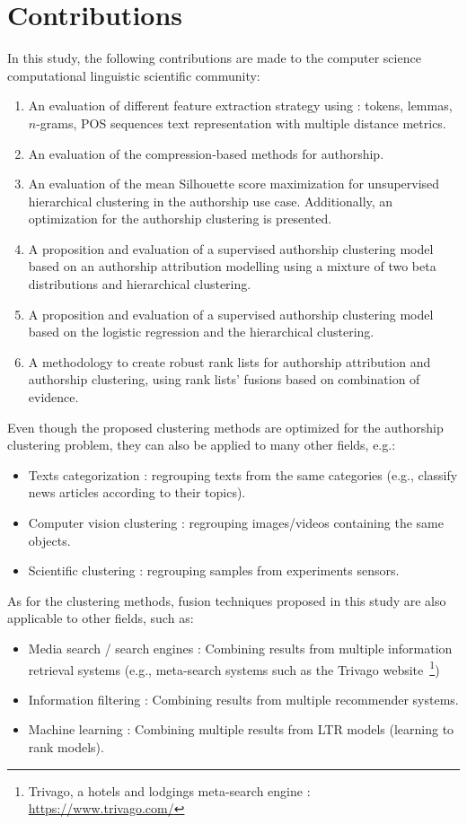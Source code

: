 \section{Contributions}

In this study, the following contributions are made to the computer science computational linguistic scientific community:

\begin{enumerate}
  \item
  An evaluation of different feature extraction strategy using : tokens, lemmas, $n$-grams, POS sequences text representation with multiple distance metrics.
  \item
  An evaluation of the compression-based methods for authorship.
  \item
  An evaluation of the mean Silhouette score maximization for unsupervised hierarchical clustering in the authorship use case. Additionally, an optimization for the authorship clustering is presented.
  \item
  A proposition and evaluation of a supervised authorship clustering model based on an authorship attribution modelling using a mixture of two beta distributions and hierarchical clustering.
  \item
  A proposition and evaluation of a supervised authorship clustering model based on the logistic regression and the hierarchical clustering.
  \item
  A methodology to create robust rank lists for authorship attribution and authorship clustering, using rank lists' fusions based on combination of evidence.
\end{enumerate}

Even though the proposed clustering methods are optimized for the authorship clustering problem, they can also be applied to many other fields, e.g.:
\begin{itemize}
  \item
  Texts categorization : regrouping texts from the same categories (e.g., classify news articles according to their topics).
  \item
  Computer vision clustering : regrouping images/videos containing the same objects.
  \item
  Scientific clustering : regrouping samples from experiments sensors.
\end{itemize}

As for the clustering methods, fusion techniques proposed in this study are also applicable to other fields, such as:
\begin{itemize}
  \item
  Media search / search engines : Combining results from multiple information retrieval systems (e.g., meta-search systems such as the Trivago website~\footnote{Trivago, a hotels and lodgings meta-search engine : \url{https://www.trivago.com/}})
  \item
  Information filtering : Combining results from multiple recommender systems.
  \item
  Machine learning : Combining multiple results from LTR models (learning to rank models).
\end{itemize}
